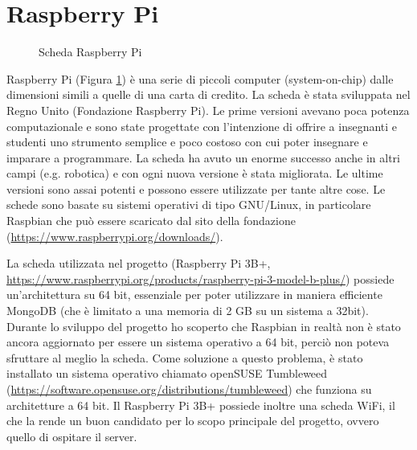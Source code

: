 \documentclass[12pt]{report}
\begin{document}
%
\section{Raspberry Pi}
%


\begin{figure}
	\caption{Scheda Raspberry Pi}
	\label{fig:raspi}
\end{figure}

Raspberry Pi (Figura \ref{fig:raspi}) è una serie di piccoli computer (system-on-chip) dalle dimensioni simili a quelle di una carta di credito. La scheda è stata sviluppata nel Regno Unito (Fondazione Raspberry Pi). Le prime versioni avevano poca potenza computazionale e sono state progettate con l'intenzione di offrire a insegnanti e studenti uno strumento semplice e poco costoso con cui poter insegnare e imparare a programmare. La scheda ha avuto un enorme successo anche in altri campi (e.g$.$ robotica) e con ogni nuova versione è stata migliorata. Le ultime versioni sono assai potenti e possono essere utilizzate per tante altre cose. Le schede sono basate su sistemi operativi di tipo GNU/Linux, in particolare Raspbian che può essere scaricato dal sito della fondazione (\url{https://www.raspberrypi.org/downloads/}). 

La scheda utilizzata nel progetto (Raspberry Pi 3B+, \url{https://www.raspberrypi.org/products/raspberry-pi-3-model-b-plus/}) possiede un'architettura su 64 bit, essenziale per poter utilizzare in maniera efficiente MongoDB (che è limitato a una memoria di 2 GB su un sistema a 32bit). Durante lo sviluppo del progetto ho scoperto che Raspbian in realtà non è stato ancora aggiornato per essere un sistema operativo a 64 bit, perciò non poteva sfruttare al meglio la scheda. Come soluzione a questo problema, è stato installato un sistema operativo chiamato openSUSE Tumbleweed (\url{https://software.opensuse.org/distributions/tumbleweed}) che funziona su architetture a 64 bit. 
Il Raspberry Pi 3B+ possiede inoltre una scheda WiFi, il che la rende un buon candidato per lo scopo principale del progetto, ovvero quello di ospitare il server.
\end{document}
